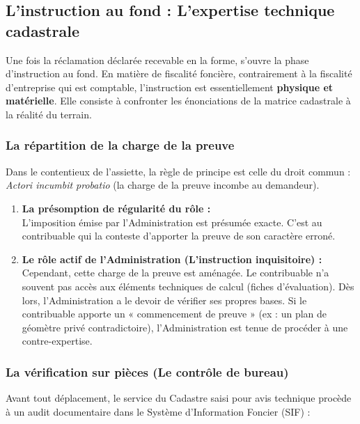 \documentclass[Cours_contentieuxTF2026.tex]{subfiles}
\begin{document}
\subsection{L'instruction au fond : L'expertise technique cadastrale}

Une fois la réclamation déclarée recevable en la forme, s'ouvre la phase d'instruction au fond. En matière de fiscalité foncière, contrairement à la fiscalité d'entreprise qui est comptable, l'instruction est essentiellement \textbf{physique et matérielle}. Elle consiste à confronter les énonciations de la matrice cadastrale à la réalité du terrain.

\subsubsection{La répartition de la charge de la preuve}

Dans le contentieux de l'assiette, la règle de principe est celle du droit commun : \textit{Actori incumbit probatio} (la charge de la preuve incombe au demandeur).

\begin{enumerate}
	\item \textbf{La présomption de régularité du rôle :} \\
	L'imposition émise par l'Administration est présumée exacte. C'est au contribuable qui la conteste d'apporter la preuve de son caractère erroné.
	
	\item \textbf{Le rôle actif de l'Administration (L'instruction inquisitoire) :} \\
	Cependant, cette charge de la preuve est aménagée. Le contribuable n'a souvent pas accès aux éléments techniques de calcul (fiches d'évaluation). Dès lors, l'Administration a le devoir de vérifier ses propres bases. Si le contribuable apporte un « commencement de preuve » (ex : un plan de géomètre privé contradictoire), l'Administration est tenue de procéder à une contre-expertise.
\end{enumerate}

\subsubsection{La vérification sur pièces (Le contrôle de bureau)}

Avant tout déplacement, le service du Cadastre saisi pour avis technique procède à un audit documentaire dans le Système d'Information Foncier (SIF) :
\end{document}
